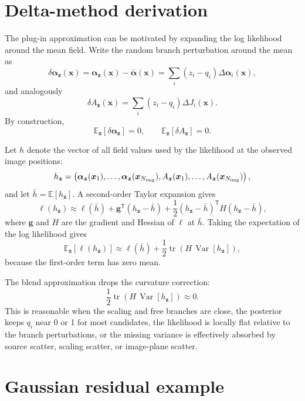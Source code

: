 \documentclass[11pt]{article}
\newcommand{\E}{\mathbb{E}}
\newcommand{\Var}{\operatorname{Var}}
\begin{document}
\section{Delta-method derivation}

The plug-in approximation can be motivated by expanding the log likelihood
around the mean field. Write the random branch perturbation around the mean as
\[
    \delta\bm{\alpha}_{\bm{z}}(\bm{x})
    =
    \bm{\alpha}_{\bm{z}}(\bm{x})-\bar{\bm{\alpha}}(\bm{x})
    =
    \sum_i (z_i-q_i)\Delta\bm{\alpha}_i(\bm{x}),
\]
and analogously
\[
    \delta A_{\bm{z}}(\bm{x})
    =
    \sum_i (z_i-q_i)\Delta J_i(\bm{x}).
\]
By construction,
\[
    \E_{\bm{z}}[\delta\bm{\alpha}_{\bm{z}}]=0,
    \qquad
    \E_{\bm{z}}[\delta A_{\bm{z}}]=0.
\]

Let $h$ denote the vector of all field values used by the likelihood at the
observed image positions:
\[
    h_{\bm{z}}
    =
    \left(\bm{\alpha}_{\bm{z}}(\bm{x}_1),\ldots,\bm{\alpha}_{\bm{z}}(\bm{x}_{N_{\rm img}}),
    A_{\bm{z}}(\bm{x}_1),\ldots,A_{\bm{z}}(\bm{x}_{N_{\rm img}})\right),
\]
and let $\bar{h}=\E[h_{\bm{z}}]$. A second-order Taylor expansion gives
\[
    \ell(h_{\bm{z}})
    \approx
    \ell(\bar{h})
    +
    \bm{g}^{\mathsf T}(h_{\bm{z}}-\bar{h})
    +
    \frac{1}{2}(h_{\bm{z}}-\bar{h})^{\mathsf T}
    H
    (h_{\bm{z}}-\bar{h}),
\]
where $\bm{g}$ and $H$ are the gradient and Hessian of $\ell$ at $\bar{h}$.
Taking the expectation of the log likelihood gives
\[
    \E_{\bm{z}}[\ell(h_{\bm{z}})]
    \approx
    \ell(\bar{h})
    +
    \frac{1}{2}
    \operatorname{tr}\!\left(H\,\Var[h_{\bm{z}}]\right),
\]
because the first-order term has zero mean.

The blend approximation drops the curvature correction:
\[
    \frac{1}{2}
    \operatorname{tr}\!\left(H\,\Var[h_{\bm{z}}]\right)
    \approx 0.
\]
This is reasonable when the scaling and free branches are close, the posterior
keeps $q_i$ near 0 or 1 for most candidates, the likelihood is locally flat
relative to the branch perturbations, or the missing variance is effectively
absorbed by source scatter, scaling scatter, or image-plane scatter.

\section{Gaussian residual example}
\end{document}
